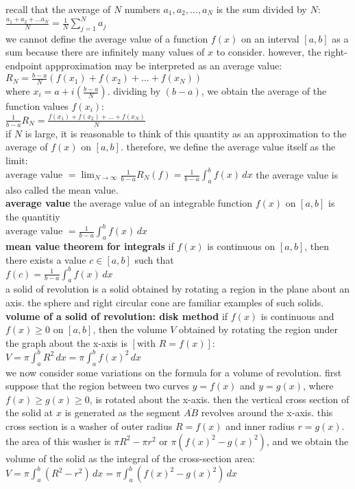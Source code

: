 \documentclass{article}
\begin{document}
recall that the average of $N$ numbers $a_1, a_2, \ldots, a_N$ is the sum divided by $N$:\\ $\frac{a_1 + a_2 + \ldots a_N}{N} = \frac{1}{N}\sum_{j=1}^{N}a_j$\\ we cannot define the average value of a function $f(x)$ on an interval $[a, b]$ as a sum because there are infinitely many values of $x$ to consider. however, the right-endpoint appproximation may be interpreted as an average value:\\ $R_N = \frac{b - a}{N}(f(x_1) + f(x_2) + \ldots + f(x_N))$\\ where $x_i = a + i(\frac{b - a}{N})$. dividing by $(b - a)$, we obtain the average of the function values $f(x_i)$:\\ $\frac{1}{b - a}R_N = \frac{f(x_1) + f(x_2) + \ldots + f(x_N)}{N}$\\ if $N$ is large, it is reasonable to think of this quantity as an approximation to the average of $f(x)$ on $[a, b]$. therefore, we define the average value itself as the limit:\\ $\text{average value } = \lim_{N \to \infty}\frac{1}{b - a}R_N(f) = \frac{1}{b - a}\int_{a}^{b}f(x)\,dx$ the average value is also called the mean value.\\

\textbf{average value} the average value of an integrable function $f(x)$ on $[a, b]$ is the quantitiy\\ $\text{average value } = \frac{1}{b - a}\int_{a}^{b}f(x)\,dx$\\

\textbf{mean value theorem for integrals} if $f(x)$ is continuous on $[a, b]$, then there exists a value $c \in [a, b]$ such that\\ $f(c) = \frac{1}{b - a}\int_{a}^{b}f(x)\,dx$\\

a solid of revolution is a solid obtained by rotating a region in the plane about an axis. the sphere and right circular cone are familiar examples of such solids.\\

\textbf{volume of a solid of revolution: disk method} if $f(x)$ is continuous and $f(x) \geq 0$ on $[a, b]$, then the volume $V$ obtained by rotating the region under the graph about the x-axis is $[\text{with } R = f(x)]$:\\ $V = \pi\int_{a}^{b}R^2\,dx = \pi\int_{a}^{b}f(x)^2\,dx$\\

we now consider some variations on the formula for a volume of revolution. first suppose that the region between two curves $y = f(x)$ and $y = g(x)$, where $f(x) \geq g(x) \geq 0$, is rotated about the x-axis. then the vertical cross section of the solid at $x$ is generated as the segment $\overline{AB}$ revolves around the x-axis. this cross section is a washer of outer radius $R = f(x)$ and inner radius $r = g(x)$. the area of this washer is $\pi R^2 - \pi r^2$ or $\pi(f(x)^2 - g(x)^2)$, and we obtain the volume of the solid as the integral of the cross-section area:\\ $V = \pi \int_{a}^{b}(R^2 - r^2)\,dx = \pi \int_{a}^{b}(f(x)^2 - g(x)^2)\,dx$\\
\end{document}
